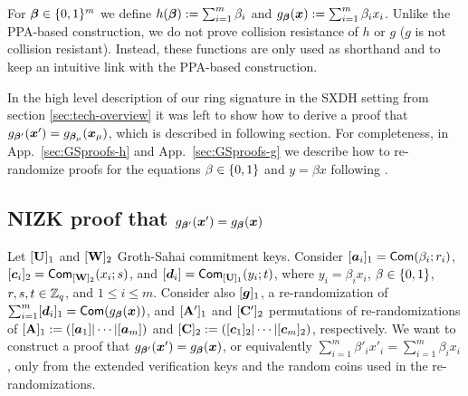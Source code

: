
For ${\boldsymbol{\beta}}\in\{0,1\}^m$ we define $h({\boldsymbol{\beta}}) := \sum_{i=1}^m \beta_i$ and $g_{\boldsymbol{\beta}}({\boldsymbol{x}}) := \sum_{i=1}^m \beta_i x_i$. Unlike the PPA-based construction, we do not prove collision resistance of $h$ or $g$ ($g$ is not collision resistant). Instead, these functions are only used as shorthand and to keep an intuitive link with the PPA-based construction.

In the high level description of our ring signature in the SXDH setting from section \ref{sec:tech-overview} it was left to show how to derive a proof that $g_{{\boldsymbol{\beta}}'}({\boldsymbol{x}}') = g_{{\boldsymbol{\beta}}_\mu}({\boldsymbol{x}}_\mu)$, which is described in following section. \ifPKC\else For completeness, in App.~\ref{sec:GSproofs-h} and App.~\ref{sec:GSproofs-g} we describe how to re-randomize proofs for the equations $\beta\in\{0,1\}$ and $y = \beta x$ following \cite{C:BCCKLS09}.\fi

\subsection{NIZK proof that $g_{{\boldsymbol{\beta}}'}({\boldsymbol{x}}') = g_{{\boldsymbol{\beta}}}({\boldsymbol{x}})$} \label{sec:prueba-g}
Let $[\mathbf{{U}}]_1$ and $[\mathbf{{W}}]_2$ Groth-Sahai commitment keys. Consider $[{\boldsymbol{a}}_i]_1 = \mathsf{Com}(\beta_i;r_i)$, $[{\boldsymbol{c}}_i]_2 = \mathsf{Com}_{[\mathbf{{W}}]_2}(x_i;s)$, and $[{\boldsymbol{d}}_i] = \mathsf{Com}_{[\mathbf{{U}}]_1}(y_i;t)$, where $y_i=\beta_ix_i$, $\beta\in\{0,1\}$, $r,s,t\in\mathbb{Z}_q$, and $1\leq i\leq m$. Consider also $[{\boldsymbol{g}}]_1$, a re-randomization of $\sum_{i=1}^m [{\boldsymbol{d}}_i]_1 = \mathsf{Com}(g_{\boldsymbol{\beta}}({\boldsymbol{x}}))$, and $[\mathbf{{A}}']_1$ and $[\mathbf{{C}}']_2$ permutations of re-randomizations of $[\mathbf{{A}}]_1 := ([{\boldsymbol{a}}_1]|\cdots|[{\boldsymbol{a}}_m])$ and $[\mathbf{{C}}]_2 := ([{\boldsymbol{c}}_1]_2|\cdots|[{\boldsymbol{c}}_m]_2)$, respectively. We want to construct a proof that $g_{{\boldsymbol{\beta}}'}({\boldsymbol{x}}') = g_{\boldsymbol{\beta}}({\boldsymbol{x}})$, or equivalently $\sum_{i=1}^m \beta'_ix'_i = \sum_{i=1}^m \beta_i x_i$, only from the extended verification keys and the random coins used in the re-randomizations.

